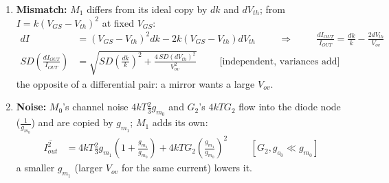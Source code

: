 \begin{enumerate}
    \paragraph{At Output:} Applying a test current $I_{test}$
      at $V_{out}$, from equation (5):
      \begin{align*}
        V_{out}(G_3 + g_{o_1}) + g_{m_1}V_{x} &= I_{test} \\
        V_{out}(G_3 + g_{o_1}) + g_{m_1}(0) &= I_{test} \quad \text{[} V_x = 0 \text{ from (6)]} \\
        \therefore Z_{out} &= \frac{V_{out}}{I_{test}} = \frac{1}{G_3 + g_{o_1}}
      \end{align*}
      Ignoring $G_3$, with \(g_{o_1} \approx K_{CLM} I_{M_1}\), we get:
      \begin{align*}
        Z_{out} &\approx \frac{1}{g_{o_1}} = \frac{1}{K_{CLM} I_{M_1}}
      \end{align*}
  \item \textbf{Mismatch:} \(M_1\) differs from its ideal copy by \(dk\) and \(dV_{th}\); from
    \(I = k(V_{GS} - V_{th})^2\) at fixed \(V_{GS}\):
    \begin{align*}
      dI &= (V_{GS} - V_{th})^2dk - 2k(V_{GS} - V_{th})dV_{th} \hspace{1cm} \Rightarrow \hspace{1cm}
      \frac{dI_{OUT}}{I_{OUT}} = \frac{dk}{k} - \frac{2dV_{th}}{V_{ov}} \\
      SD\left(\frac{dI_{OUT}}{I_{OUT}}\right) &= \sqrt{SD\left(\tfrac{dk}{k}\right)^2 + \frac{4\,SD(dV_{th})^2}{V_{ov}^2}} \hspace{1cm} \text{[independent, variances add]}
    \end{align*}
    the opposite of a differential pair: a mirror wants a large \(V_{ov}\).
  \item \textbf{Noise:} \(M_0\)'s channel noise \(4kT\frac{2}{3}g_{m_0}\) and \(G_2\)'s \(4kTG_2\) flow into the diode node (\(\frac{1}{g_{m_0}}\)) and are copied
    by \(g_{m_1}\); \(M_1\) adds its own:
    \begin{align*}
      \overline{I_{out}^2} &= 4kT\frac{2}{3}g_{m_1}\left(1 + \frac{g_{m_1}}{g_{m_0}}\right) + 4kTG_2\left(\frac{g_{m_1}}{g_{m_0}}\right)^2 \hspace{1cm} [G_2, g_{o_0} \ll g_{m_0}]
    \end{align*}
    a smaller \(g_{m_1}\) (larger \(V_{ov}\) for the same current) lowers it.
\end{enumerate}

